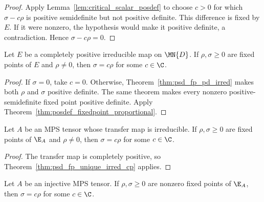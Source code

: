 \begin{proof}\leanok
    Apply Lemma~\ref{lem:critical_scalar_posdef} to choose $c>0$ for which
    $\sigma-c\rho$ is positive semidefinite but not positive definite. This
    difference is fixed by $E$. If it were nonzero, the hypothesis would make
    it positive definite, a contradiction. Hence $\sigma-c\rho=0$.
\end{proof}

\begin{theorem}
    \label{thm:psd_fp_unique_irred_cp}
    \leanok
    Let $E$ be a completely positive irreducible map on $\MN{D}$. If
    $\rho,\sigma\geq0$ are fixed points of $E$ and $\rho\neq0$, then
    $\sigma=c\rho$ for some $c\in\C$.
\end{theorem}

\begin{proof}\leanok
    If $\sigma=0$, take $c=0$. Otherwise,
    Theorem~\ref{thm:psd_fp_pd_irred} makes both $\rho$ and $\sigma$
    positive definite. The same theorem makes every nonzero
    positive-semidefinite fixed point positive definite. Apply
    Theorem~\ref{thm:posdef_fixedpoint_proportional}.
\end{proof}

\begin{theorem}
    \label{thm:psd_fp_unique_irred}
    \leanok
    Let $A$ be an MPS tensor whose transfer map is irreducible. If
    $\rho,\sigma\geq0$ are fixed points of $\E_A$ and $\rho\neq0$, then
    $\sigma=c\rho$ for some $c\in\C$.
\end{theorem}

\begin{proof}\leanok
    The transfer map is completely positive, so
    Theorem~\ref{thm:psd_fp_unique_irred_cp} applies.
\end{proof}

\begin{theorem}
    \label{thm:psd_fp_unique}
    \leanok
    Let $A$ be an injective MPS tensor. If $\rho,\sigma\geq0$ are nonzero
    fixed points of $\E_A$, then $\sigma=c\rho$ for some $c\in\C$.
\end{theorem}


